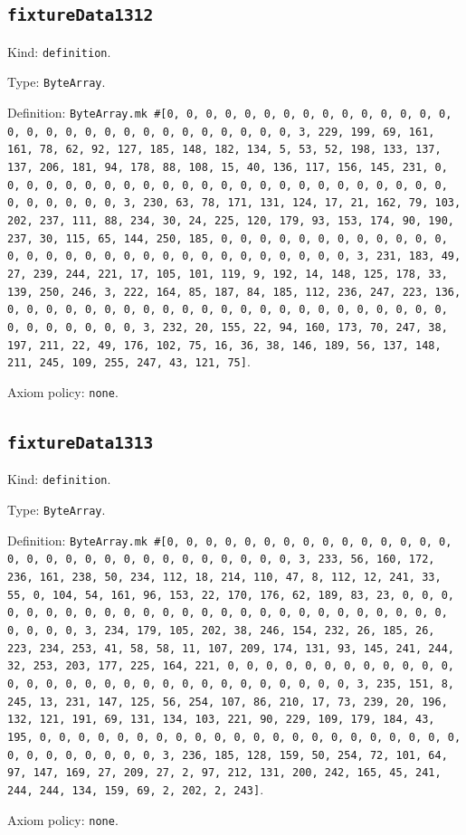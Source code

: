 \documentclass[11pt]{article}
\begin{document}
\subsection*{\texttt{fixtureData1312}}
\noindent Kind: \texttt{definition}.\par
\noindent Type: \texttt{ByteArray}.\par
\noindent Definition: \texttt{ByteArray.mk \#[0, 0, 0, 0, 0, 0, 0, 0, 0, 0, 0, 0, 0, 0, 0, 0, 0, 0, 0, 0, 0, 0, 0, 0, 0, 0, 0, 0, 0, 0, 3, 229, 199, 69, 161, 161, 78, 62, 92, 127, 185, 148, 182, 134, 5, 53, 52, 198, 133, 137, 137, 206, 181, 94, 178, 88, 108, 15, 40, 136, 117, 156, 145, 231, 0, 0, 0, 0, 0, 0, 0, 0, 0, 0, 0, 0, 0, 0, 0, 0, 0, 0, 0, 0, 0, 0, 0, 0, 0, 0, 0, 0, 0, 0, 3, 230, 63, 78, 171, 131, 124, 17, 21, 162, 79, 103, 202, 237, 111, 88, 234, 30, 24, 225, 120, 179, 93, 153, 174, 90, 190, 237, 30, 115, 65, 144, 250, 185, 0, 0, 0, 0, 0, 0, 0, 0, 0, 0, 0, 0, 0, 0, 0, 0, 0, 0, 0, 0, 0, 0, 0, 0, 0, 0, 0, 0, 0, 0, 3, 231, 183, 49, 27, 239, 244, 221, 17, 105, 101, 119, 9, 192, 14, 148, 125, 178, 33, 139, 250, 246, 3, 222, 164, 85, 187, 84, 185, 112, 236, 247, 223, 136, 0, 0, 0, 0, 0, 0, 0, 0, 0, 0, 0, 0, 0, 0, 0, 0, 0, 0, 0, 0, 0, 0, 0, 0, 0, 0, 0, 0, 0, 0, 3, 232, 20, 155, 22, 94, 160, 173, 70, 247, 38, 197, 211, 22, 49, 176, 102, 75, 16, 36, 38, 146, 189, 56, 137, 148, 211, 245, 109, 255, 247, 43, 121, 75]}.\par
\noindent Axiom policy: \texttt{none}.\par
\subsection*{\texttt{fixtureData1313}}
\noindent Kind: \texttt{definition}.\par
\noindent Type: \texttt{ByteArray}.\par
\noindent Definition: \texttt{ByteArray.mk \#[0, 0, 0, 0, 0, 0, 0, 0, 0, 0, 0, 0, 0, 0, 0, 0, 0, 0, 0, 0, 0, 0, 0, 0, 0, 0, 0, 0, 0, 0, 3, 233, 56, 160, 172, 236, 161, 238, 50, 234, 112, 18, 214, 110, 47, 8, 112, 12, 241, 33, 55, 0, 104, 54, 161, 96, 153, 22, 170, 176, 62, 189, 83, 23, 0, 0, 0, 0, 0, 0, 0, 0, 0, 0, 0, 0, 0, 0, 0, 0, 0, 0, 0, 0, 0, 0, 0, 0, 0, 0, 0, 0, 0, 0, 3, 234, 179, 105, 202, 38, 246, 154, 232, 26, 185, 26, 223, 234, 253, 41, 58, 58, 11, 107, 209, 174, 131, 93, 145, 241, 244, 32, 253, 203, 177, 225, 164, 221, 0, 0, 0, 0, 0, 0, 0, 0, 0, 0, 0, 0, 0, 0, 0, 0, 0, 0, 0, 0, 0, 0, 0, 0, 0, 0, 0, 0, 0, 0, 3, 235, 151, 8, 245, 13, 231, 147, 125, 56, 254, 107, 86, 210, 17, 73, 239, 20, 196, 132, 121, 191, 69, 131, 134, 103, 221, 90, 229, 109, 179, 184, 43, 195, 0, 0, 0, 0, 0, 0, 0, 0, 0, 0, 0, 0, 0, 0, 0, 0, 0, 0, 0, 0, 0, 0, 0, 0, 0, 0, 0, 0, 0, 0, 3, 236, 185, 128, 159, 50, 254, 72, 101, 64, 97, 147, 169, 27, 209, 27, 2, 97, 212, 131, 200, 242, 165, 45, 241, 244, 244, 134, 159, 69, 2, 202, 2, 243]}.\par
\noindent Axiom policy: \texttt{none}.\par
\end{document}
